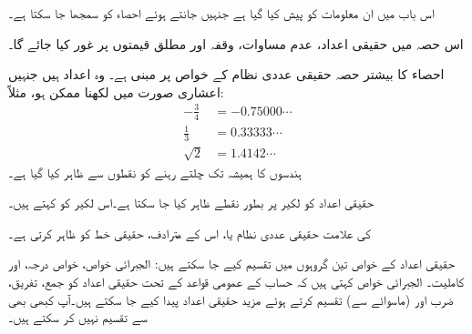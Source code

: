 اس باب میں ان معلومات کو پیش کیا گیا ہے جنہیں جانتے ہوئے احصاء کو سمجھا جا سکتا ہے۔

اس حصہ میں حقیقی اعداد، عدم مساوات، وقفہ اور مطلق قیمتوں پر غور کیا جائے گا۔

احصاء کا بیشتر حصہ حقیقی عددی نظام کے خواص پر مبنی ہے۔ وہ اعداد ہیں جنہیں اعشاری صورت میں لکھنا ممکن ہو، مثلاً:
\begin{align*}
-\frac{3}{4}&=-0.75000\cdots\\
\frac{1}{3}&=0.33333\cdots\\
\sqrt{2}&=1.4142\cdots
\end{align*}
ہندسوں کا  ہمیشہ تک چلتے رہنے کو نقطوں  سے ظاہر کیا گیا ہے۔

حقیقی اعداد کو لکیر پر بطور نقطے ظاہر کیا جا سکتا ہے۔اس لکیر کو  کہتے ہیں۔
\begin{center}
\end{center}
 کی علامت حقیقی عددی نظام یا، اس کے مترادف، حقیقی خط کو ظاہر کرتی ہے۔

حقیقی اعداد کے خواص تین گروہوں میں تقسیم کیے جا سکتے ہیں: الجبرائی خواص، خواص درجہ، اور کاملیت۔ الجبرائی خواص کہتی ہیں کہ حساب کے عمومی قواعد کے تحت حقیقی اعداد کو جمع، تفریق، ضرب اور (ماسوائے  سے) تقسیم   کرتے ہوئے مزید حقیقی اعداد پیدا کیے جا سکتے ہیں۔آپ کبھی بھی  سے تقسیم نہیں کر سکتے ہیں۔

